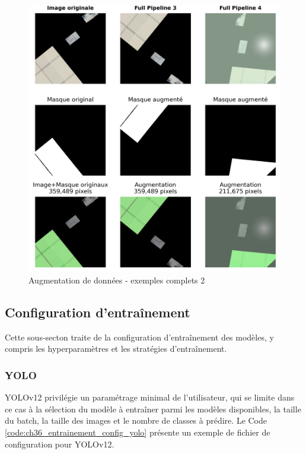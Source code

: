 \begin{figure}[H]
    \centering
    \includegraphics[width=1\linewidth]{02-main/figures/ch3/ch36_augmentations_15_exemples_complets2.png}
    \caption{Augmentation de données - exemples complets 2}
    \label{fig:ch36_augmentations_15_exemples_complets2}
\end{figure}



\subsection{Configuration d'entraînement} %
Cette sous-secton traite de la configuration d'entraînement des modèles, y compris les hyperparamètres et les stratégies d'entraînement.
\subsubsection{YOLO}
YOLOv12 privilégie un paramétrage minimal de l'utilisateur, qui se limite dans ce cas à la sélection du modèle à entraîner parmi les modèles disponibles, la taille du batch, la taille des images et le nombre de classes à prédire. Le Code \ref{code:ch36_entrainement_config_yolo} présente un exemple de fichier de configuration pour YOLOv12.

